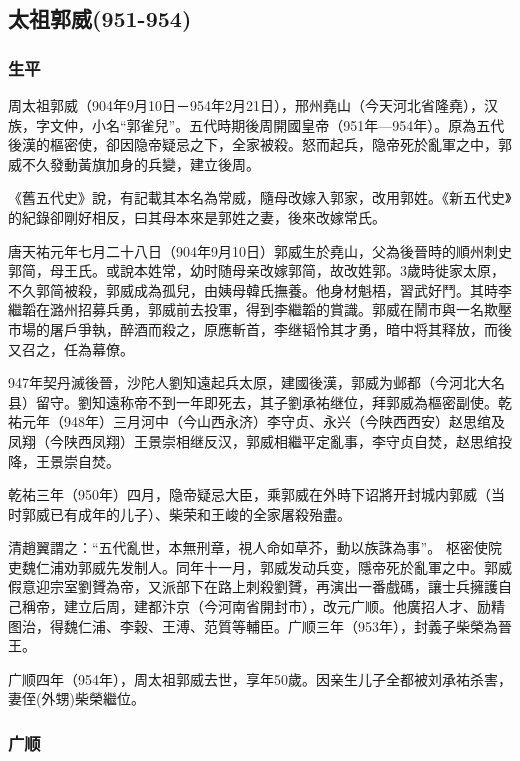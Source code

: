 
\subsection{太祖郭威\tiny(951-954)}

\subsubsection{生平}

周太祖郭威（904年9月10日－954年2月21日），邢州堯山（今天河北省隆堯），汉族，字文仲，小名“郭雀兒”。五代時期後周開國皇帝（951年—954年）。原為五代後漢的樞密使，卻因隐帝疑忌之下，全家被殺。怒而起兵，隐帝死於亂軍之中，郭威不久發動黃旗加身的兵變，建立後周。

《舊五代史》說，有記載其本名為常威，隨母改嫁入郭家，改用郭姓。《新五代史》的紀錄卻剛好相反，曰其母本來是郭姓之妻，後來改嫁常氏。

唐天祐元年七月二十八日（904年9月10日）郭威生於堯山，父為後晉時的順州刺史郭简，母王氏。或說本姓常，幼时随母亲改嫁郭简，故改姓郭。3歲時徙家太原，不久郭简被殺，郭威成為孤兒，由姨母韓氏撫養。他身材魁梧，習武好鬥。其時李繼韜在潞州招募兵勇，郭威前去投軍，得到李繼韜的賞識。郭威在鬧市與一名欺壓市場的屠戶爭執，醉酒而殺之，原應斬首，李继韬怜其才勇，暗中将其释放，而後又召之，任為幕僚。

947年契丹滅後晉，沙陀人劉知遠起兵太原，建國後漢，郭威为邺都（今河北大名县）留守。劉知遠称帝不到一年即死去，其子劉承祐继位，拜郭威為樞密副使。乾祐元年（948年）三月河中（今山西永济）李守贞、永兴（今陕西西安）赵思绾及凤翔（今陕西凤翔）王景崇相继反汉，郭威相繼平定亂事，李守贞自焚，赵思绾投降，王景崇自焚。

乾祐三年（950年）四月，隐帝疑忌大臣，乘郭威在外時下诏將开封城内郭威（当时郭威已有成年的儿子）、柴荣和王峻的全家屠殺殆盡。

清趙翼謂之：“五代亂世，本無刑章，視人命如草芥，動以族誅為事”。 枢密使院吏魏仁浦劝郭威先发制人。同年十一月，郭威发动兵变，隱帝死於亂軍之中。郭威假意迎宗室劉贇為帝，又派部下在路上刺殺劉贇，再演出一番戲碼，讓士兵擁護自己稱帝，建立后周，建都汴京（今河南省開封市），改元广顺。他廣招人才、励精图治，得魏仁浦、李穀、王溥、范質等輔臣。广顺三年（953年），封義子柴榮為晉王。

广顺四年（954年），周太祖郭威去世，享年50歲。因亲生儿子全都被刘承祐杀害，妻侄(外甥)柴榮繼位。


\subsubsection{广顺}

